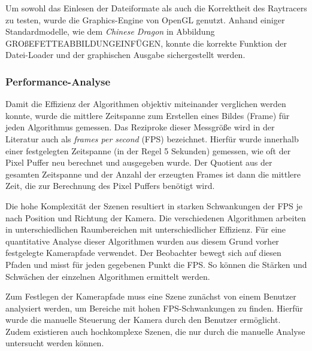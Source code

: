 \documentclass[crop=false]{standalone}
\begin{document}
        Um sowohl das Einlesen der Dateiformate als auch die Korrektheit des Raytracers zu testen, wurde die Graphics-Engine von OpenGL genutzt.
        Anhand einiger Standardmodelle, wie dem \textit{Chinese Dragon} in Abbildung GROßEFETTEABBILDUNGEINFÜGEN, konnte die korrekte Funktion der Datei-Loader und der graphischen Ausgabe sichergestellt werden.

      \subsubsection{Performance-Analyse} %
      \label{ssub:performance_analyse}
        Damit die Effizienz der Algorithmen objektiv miteinander verglichen werden konnte, wurde die mittlere Zeitspanne zum Erstellen eines Bildes (Frame) für jeden Algorithmus gemessen.
        Das Reziproke dieser Messgröße wird in der Literatur auch als \textit{frames per second} (FPS) bezeichnet.
        Hierfür wurde innerhalb einer festgelegten Zeitspanne (in der Regel 5 Sekunden) gemessen, wie oft der Pixel Puffer neu berechnet und ausgegeben wurde.
        Der Quotient aus der gesamten Zeitspanne und der Anzahl der erzeugten Frames ist dann die mittlere Zeit, die zur Berechnung des Pixel Puffers benötigt wird.

        Die hohe Komplexität der Szenen resultiert in starken Schwankungen der FPS je nach Position und Richtung der Kamera.
        Die verschiedenen Algorithmen arbeiten in unterschiedlichen Raumbereichen mit unterschiedlicher Effizienz.
        Für eine quantitative Analyse dieser Algorithmen wurden aus diesem Grund vorher festgelegte Kamerapfade verwendet.
        Der Beobachter bewegt sich auf diesen Pfaden und misst für jeden gegebenen Punkt die FPS.
        So können die Stärken und Schwächen der einzelnen Algorithmen ermittelt werden.

        Zum Festlegen der Kamerapfade muss eine Szene zunächst von einem Benutzer analysiert werden, um Bereiche mit hohen FPS-Schwankungen zu finden.
        Hierfür wurde die manuelle Steuerung der Kamera durch den Benutzer ermöglicht.
        Zudem existieren auch hochkomplexe Szenen, die nur durch die manuelle Analyse untersucht werden können.
\end{document}
